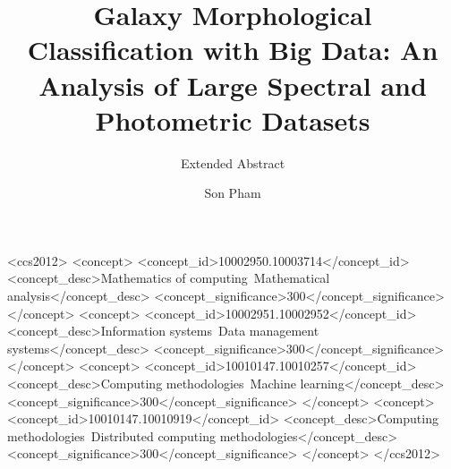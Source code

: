 \documentclass[11pt,sigconf]{acmart}
\begin{document}
\title{Galaxy Morphological Classification with Big Data: An Analysis of Large Spectral and Photometric Datasets}
\subtitle{Extended Abstract}

\author{Son Pham}


\renewcommand{\shortauthors}{S. Pham}


\begin{abstract}

\end{abstract}

%
%
\begin{CCSXML}
  <ccs2012>
  <concept>
  <concept_id>10002950.10003714</concept_id>
  <concept_desc>Mathematics of computing~Mathematical analysis</concept_desc>
  <concept_significance>300</concept_significance>
  </concept>
  <concept>
  <concept_id>10002951.10002952</concept_id>
  <concept_desc>Information systems~Data management systems</concept_desc>
  <concept_significance>300</concept_significance>
  </concept>
  <concept>
  <concept_id>10010147.10010257</concept_id>
  <concept_desc>Computing methodologies~Machine learning</concept_desc>
  <concept_significance>300</concept_significance>
  </concept>
  <concept>
  <concept_id>10010147.10010919</concept_id>
  <concept_desc>Computing methodologies~Distributed computing methodologies</concept_desc>
  <concept_significance>300</concept_significance>
  </concept>
  </ccs2012>
\end{CCSXML}





\maketitle
\end{document}

